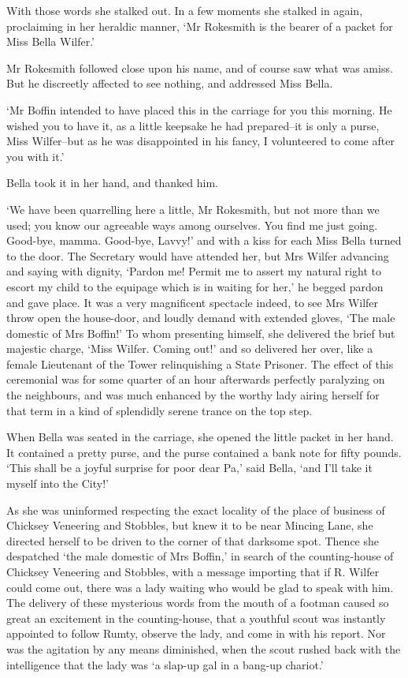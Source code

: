With those words she stalked out. In a few moments she stalked in again,
proclaiming in her heraldic manner, ‘Mr Rokesmith is the bearer of a
packet for Miss Bella Wilfer.’

Mr Rokesmith followed close upon his name, and of course saw what was
amiss. But he discreetly affected to see nothing, and addressed Miss
Bella.

‘Mr Boffin intended to have placed this in the carriage for you
this morning. He wished you to have it, as a little keepsake he had
prepared--it is only a purse, Miss Wilfer--but as he was disappointed in
his fancy, I volunteered to come after you with it.’

Bella took it in her hand, and thanked him.

‘We have been quarrelling here a little, Mr Rokesmith, but not more than
we used; you know our agreeable ways among ourselves. You find me just
going. Good-bye, mamma. Good-bye, Lavvy!’ and with a kiss for each Miss
Bella turned to the door. The Secretary would have attended her, but
Mrs Wilfer advancing and saying with dignity, ‘Pardon me! Permit me to
assert my natural right to escort my child to the equipage which is
in waiting for her,’ he begged pardon and gave place. It was a very
magnificent spectacle indeed, to see Mrs Wilfer throw open the
house-door, and loudly demand with extended gloves, ‘The male domestic
of Mrs Boffin!’ To whom presenting himself, she delivered the brief but
majestic charge, ‘Miss Wilfer. Coming out!’ and so delivered her over,
like a female Lieutenant of the Tower relinquishing a State Prisoner.
The effect of this ceremonial was for some quarter of an hour afterwards
perfectly paralyzing on the neighbours, and was much enhanced by the
worthy lady airing herself for that term in a kind of splendidly serene
trance on the top step.

When Bella was seated in the carriage, she opened the little packet in
her hand. It contained a pretty purse, and the purse contained a bank
note for fifty pounds. ‘This shall be a joyful surprise for poor dear
Pa,’ said Bella, ‘and I’ll take it myself into the City!’

As she was uninformed respecting the exact locality of the place of
business of Chicksey Veneering and Stobbles, but knew it to be near
Mincing Lane, she directed herself to be driven to the corner of that
darksome spot. Thence she despatched ‘the male domestic of Mrs Boffin,’
in search of the counting-house of Chicksey Veneering and Stobbles, with
a message importing that if R. Wilfer could come out, there was a lady
waiting who would be glad to speak with him. The delivery of these
mysterious words from the mouth of a footman caused so great an
excitement in the counting-house, that a youthful scout was instantly
appointed to follow Rumty, observe the lady, and come in with his
report. Nor was the agitation by any means diminished, when the scout
rushed back with the intelligence that the lady was ‘a slap-up gal in a
bang-up chariot.’


